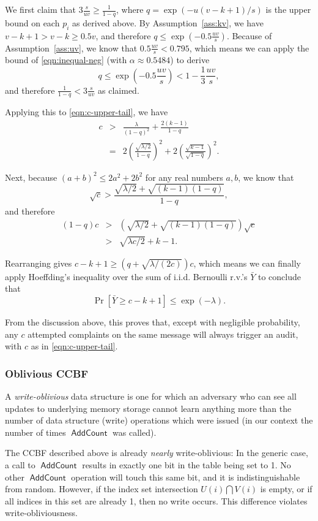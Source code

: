 \documentclass[letterpaper,12pt]{article}
\DeclareMathOperator{\AddCount}{\textsf{AddCount}}
\begin{document}
We first claim that $3\frac{s}{uv} \ge \frac{1}{1-q}$, where
$q=\exp(-u(v-k+1)/s)$ is the upper bound on each $p_i$ as derived above.
By Assumption~\ref{ass:kv}, we have $v-k+1 > v-k \ge 0.5 v$, and
therefore $q \le \exp(-0.5 \frac{uv}{s})$. Because of
Assumption~\ref{ass:uv}, we know that $0.5\frac{uv}{s} < 0.795$, which
means we can apply the bound of \eqref{eqn:inequal-neg}
(with $\alpha\approx 0.5484$) to derive
\[q \le \exp(-0.5 \frac{uv}{s}) < 1 - \frac{1}{3} \frac{uv}{s},\]
and therefore $\frac{1}{1-q} < 3\frac{s}{uv}$ as claimed.

Applying this to \eqref{eqn:c-upper-tail}, we have
\begin{eqnarray*}
  c &>& \frac{\lambda}{(1-q)^2} + \frac{2(k-1)}{1-q} \\
  &=& 2\left(\frac{\sqrt{\lambda/2}}{1-q}\right)^2
    + 2\left(\frac{\sqrt{k-1}}{\sqrt{1-q}}\right)^2.
\end{eqnarray*}

Next, because \((a+b)^2 \le 2a^2 + 2b^2\) for any real numbers $a,b$, we
know that
\[\sqrt{c} > \frac{\sqrt{\lambda/2} + \sqrt{(k-1)(1-q)}}{1-q},\]
and therefore
\begin{eqnarray*}
(1-q)c
  &>& \left(\sqrt{\lambda/2} + \sqrt{(k-1)(1-q)}\right)\sqrt{c} \\
  &>& \sqrt{\lambda c/2} + k - 1.
\end{eqnarray*}

Rearranging gives $c-k+1 \ge \left(q + \sqrt{\lambda/(2c)}\right)c$,
which means we can finally apply Hoeffding's inequality over the sum of
i.i.d. Bernoulli r.v.'s $\bar{Y}$ to conclude that
\[\Pr[\bar{Y} \ge c-k+1] \le \exp(-\lambda).\]

From the discussion above, this proves that, except with negligible
probability, any $c$ attempted complaints on the same message will
always trigger an audit, with $c$ as in \eqref{eqn:c-upper-tail}.


\subsubsection{Oblivious CCBF}

A \emph{write-oblivious} data structure is one for which an adversary
who can see all updates to underlying memory storage cannot learn
anything more than the number of data structure (write) operations which
were issued (in our context the number of times $\AddCount$ was called).

The CCBF described above is already \emph{nearly} write-oblivious: In
the generic case, a call to $\AddCount$ results in exactly one bit in
the table being set to 1. No other $\AddCount$ operation will touch this
same bit, and it is indistinguishable from random. However, if the
index set intersection $U(i)\bigcap V(i)$ is empty, or if all indices in
this set are already 1, then no write occurs. This difference violates
write-obliviousness.
\end{document}
